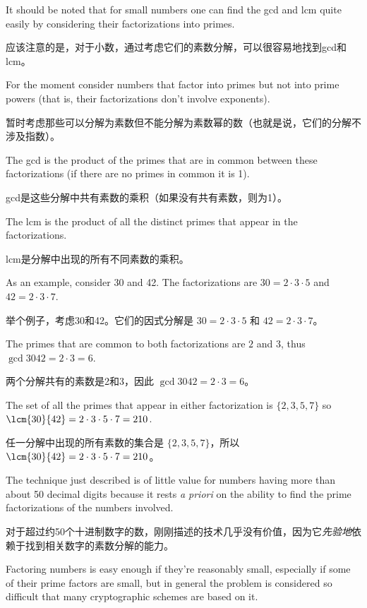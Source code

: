 \clearpage 

It should be noted that for small numbers one can find the gcd and lcm
quite easily by considering their factorizations into primes.

应该注意的是，对于小数，通过考虑它们的素数分解，可以很容易地找到gcd和lcm。

For the
moment consider numbers that factor into primes but not into prime
powers (that is, their factorizations don't involve exponents).

暂时考虑那些可以分解为素数但不能分解为素数幂的数（也就是说，它们的分解不涉及指数）。

The
gcd is the product of the primes that are in common between these
factorizations (if there are no primes in common it is 1).

gcd是这些分解中共有素数的乘积（如果没有共有素数，则为1）。

The lcm is
the product of all the distinct primes 
that appear in the factorizations.

lcm是分解中出现的所有不同素数的乘积。

As an example, consider 30 and 42.
The factorizations are $30 = 2\cdot 3\cdot 5$ and $42 = 2\cdot 3 \cdot
7$.

举个例子，考虑30和42。它们的因式分解是 $30 = 2\cdot 3\cdot 5$ 和 $42 = 2\cdot 3 \cdot 7$。

The primes that are common to both factorizations are $2$ and
$3$, thus $\gcd{30}{42} = 2\cdot 3 = 6$.

两个分解共有的素数是2和3，因此 $\gcd{30}{42} = 2\cdot 3 = 6$。

The set of all the primes 
that appear in either factorization is $\{2, 3, 5, 7 \}$ so
$\lcm{30}{42} = 2\cdot 3\cdot 5\cdot 7 = 210$.

任一分解中出现的所有素数的集合是 $\{2, 3, 5, 7 \}$，所以 $\lcm{30}{42} = 2\cdot 3\cdot 5\cdot 7 = 210$。

The technique just described is of little value for numbers having more
than about 50 decimal digits because it rests {\em a priori} on the
ability to find the prime factorizations of the numbers involved.

对于超过约50个十进制数字的数，刚刚描述的技术几乎没有价值，因为它{\em 先验地}依赖于找到相关数字的素数分解的能力。

Factoring numbers is easy enough if they're reasonably small,
especially if some of their prime factors are small, but in general
the problem is considered so difficult that many cryptographic schemes
are based on it.

